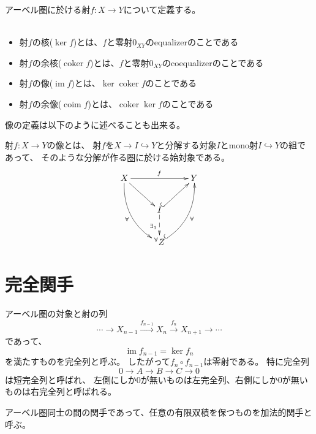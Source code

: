 \documentclass[a4j]{jarticle}
\newcommand{\coker}{\operatorname{coker}}
\newcommand{\im}{\operatorname{im}}
\newcommand{\coim}{\operatorname{coim}}
\newcommand{\arr}[1]{\overset{#1}{\longrightarrow}}
\begin{document}
\begin{Def}
    アーベル圏に於ける射$f:X \to Y$について定義する。
    ~~~~~~~~~~~~~~~~~~~~~~~~~~~~~~~~~~~~~~~~~
    \begin{itemize}
        \item 射$f$の核($\ker f$)とは、$f$と零射$0_{XY}$のequalizerのことである
        \item 射$f$の余核($\coker f$)とは、$f$と零射$0_{XY}$のcoequalizerのことである
        \item 射$f$の像($\im f$)とは、$\ker \coker f$のことである
        \item 射$f$の余像($\coim f$)とは、$\coker \ker f$のことである
    \end{itemize}
\end{Def}

像の定義は以下のように述べることも出来る。
\begin{Def}[像/image] \label{image}
    射$f:X \to Y$の像とは、
    射$f$を$X \to I \hookrightarrow Y$と分解する対象$I$とmono射$I \hookrightarrow Y$の組であって、
    そのような分解が作る圏に於ける始対象である。
    \[
    \begin{xy}
    \xymatrix
    {
    X \ar[rr]^{f} \ar[rd] \ar@/_14pt/[rdd]_{\forall} &   & Y \\
    & I \ar@{^{(}->}[ru] \ar@{-->}[d]_{\exists_1} &   \\
    & {}^\forall Z \ar@{^{(}->}@/_14pt/[ruu]_{\forall} &   
    }
    \end{xy}
    \]
\end{Def}

\section{完全関手}
\begin{Def}
    アーベル圏の対象と射の列
    \[ \cdots \to X_{n-1} \arr{f_{n-1}} X_{n} \arr{f_{n}} X_{n+1} \to \cdots \]
    であって、
    \[ \im f_{n-1}=\ker f_{n}\]
    を満たすものを完全列と呼ぶ。
    したがって$f_{n} \circ f_{n-1}$は零射である。
    特に完全列
    \[ 0 \to A \to B \to C \to 0 \]
    は短完全列と呼ばれ、
    左側にしか0が無いものは左完全列、右側にしか0が無いものは右完全列と呼ばれる。
\end{Def}

\begin{Def}
    アーベル圏同士の間の関手であって、任意の有限双積を保つものを加法的関手と呼ぶ。
\end{Def}
\end{document}
